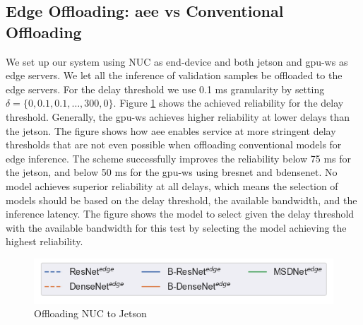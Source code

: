 \subsection{Edge Offloading: \gls{aee} vs Conventional Offloading}
We set up our system using NUC as end-device and both \gls{jetson} and \gls{gpu-ws} as edge servers. We let all the inference of validation samples be offloaded to the edge servers. For the delay threshold we use 0.1 ms granularity by setting $\delta = \{0,0.1,0.1, \dots, 300,0\}$. Figure \ref{fig:practical-offloading}  shows the achieved reliability for the delay threshold. Generally, the \gls{gpu-ws} achieves higher reliability at lower delays than the \gls{jetson}. The figure shows how \gls{aee} enables service at more stringent delay thresholds that are not even possible when offloading conventional models for edge inference. The scheme successfully improves the reliability below 75 ms for the \gls{jetson}, and below 50 ms for the \gls{gpu-ws} using \gls{bresnet} and \gls{bdensenet}. 
No model achieves superior reliability at all delays, which means the selection of models should be based on the delay threshold, the available bandwidth, and the inference latency. The figure shows the model to select given the delay threshold with the available bandwidth for this test by selecting the model achieving the highest reliability.
\begin{figure}
	\captionsetup[subfigure]{justification=centering,farskip=1pt,captionskip=1pt}
	\centering
	\includegraphics[width=.5\linewidth]{figures/edge/offloading_legend}
	\hfill
	\caption[Offloading NUC to Jetson]{Offloading NUC to Jetson}
	\label{fig:practical-offloading}
\end{figure}
